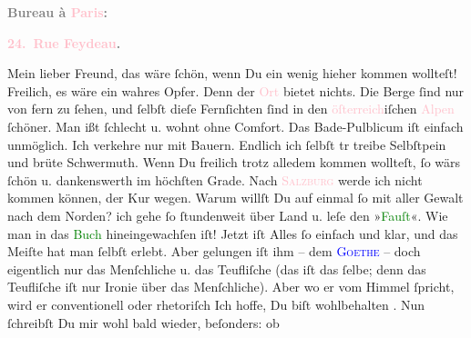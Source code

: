            \begin{otherlanguage}{french}\textcolor{gray}{\textbf{\textbf{Bureau à \textcolor{pink}{Paris}{}\ledrightnote{\textcolor{pink}{Paris}}:}}}\end{otherlanguage}\pend
           \pstart
           \begin{otherlanguage}{french}\textcolor{gray}{\textbf{\textbf{\textcolor{pink}{24. Rue Feydeau}{}\ledrightnote{\textcolor{pink}{rue Feydeau}}.}}}\end{otherlanguage}\pend
           \pstart\center{}Mein lieber Freund,\pend\pstart
           das wäre ſchön, wenn Du ein wenig hieher kommen wollteſt! Freilich, es wäre ein
               wahres Opfer. Denn der \textcolor{pink}{Ort}{}
               bietet nichts. Die Berge ſind nur von fern zu ſehen, und ſelbſt dieſe Fernſichten
               ſind in den \textcolor{pink}{öſterreich}{}\ledrightnote{\textcolor{pink}{Österreich}}iſchen \textcolor{pink}{Alpen}{}\ledrightnote{\textcolor{pink}{Alpen}} ſchöner. Man ißt ſchlecht u. wohnt ohne Comfort. Das
               Bade-Pulblicum iſt einfach unmöglich. Ich verkehre nur mit Bauern. {\pb}Endlich ich ſelbſt tr\strikeout{\textcolor{gray}{eb}} treibe Selbſtpein und brüte Schwermuth. Wenn Du freilich trotz alledem kommen
               wollteſt, ſo wärs ſchön u. dankenswerth im höchſten Grade.\pend
           \pstart
           Nach \textsc{\textcolor{pink}{Salzburg}{}\ledrightnote{\textcolor{pink}{Salzburg}}} werde ich nicht kommen können, der Kur wegen.\pend
           \pstart
           Warum willſt Du auf einmal ſo mit aller Gewalt nach dem Norden?\pend
           \pstart
           ich gehe ſo ſtundenweit über Land u. leſe den
                  »\textcolor{green}{Fauſt}{}\ledrightnote{\textcolor{green}{Faust}}«. Wie man in das {\pb}\textcolor{green}{Buch}{} hineingewachſen iſt!
               Jetzt iſt Alles ſo einfach und klar, und das Meiſte hat man ſelbſt erlebt. Aber
               gelungen iſt ihm – dem \textsc{\textcolor{blue}{Goethe}{}\ledrightnote{\textcolor{blue}{Johann Wolfgang von Goethe}}} – doch eigentlich nur das Menſchliche u. das Teufliſche (das iſt das ſelbe;
               denn das Teufliſche iſt nur Ironie über das Menſchliche). Aber wo er vom Himmel
               ſpricht, wird er conventionell oder rhetoriſch{\dotsfive}\pend
           \pstart
           \strikeout{\textcolor{gray}{×}\-\textcolor{gray}{×}} Ich hoffe, Du biſt wohlbehalten \label{K_L02744-1v}\label{K_L02744-1h}. Nun ſchreibſt Du mir wohl bald wieder, beſonders: ob

